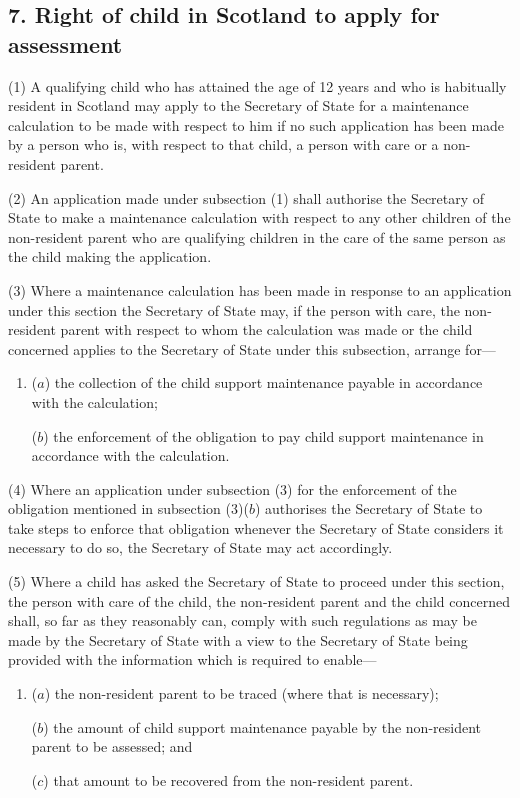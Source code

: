 \documentclass[12pt,a4paper]{article}
\begin{document}
\subsection{7. Right of child in Scotland to apply for assessment}

(1) A qualifying child who has attained the age of 12 years and who is habitually
resident in Scotland may apply to the Secretary of State for a maintenance calculation to be made with respect to him if
no such application has been made by a person who is, with respect to that
child, a person with care or a non-resident parent.

(2)
An application made under subsection (1) shall authorise the 
Secretary of
State to make a maintenance calculation
with respect to
any other children of the non-resident parent
who are qualifying
children in the care of the same person as the child making the application.

(3)
Where a maintenance calculation
has been made in
response to an application under this section the Secretary of State may, if the
person with care, the non-resident parent
with respect to whom the
calculation
was made or the child concerned applies to 
the Secretary
of State under this subsection, arrange for---
\begin{enumerate}\item[]
($a$)
the collection of the child support maintenance payable in accordance
with the calculation;

($b$)
the enforcement of the obligation to pay child support maintenance in
accordance with the calculation.
\end{enumerate}
	
(4)
Where an application under subsection (3) for the enforcement of the
obligation mentioned in subsection (3)($b$) authorises the Secretary of State to take
steps to enforce that obligation whenever the Secretary of State considers it
necessary to do so, the Secretary of State may act accordingly.

(5)
Where a child has asked the Secretary of State to proceed under this section,
the person with care of the child, the non-resident parent
and the
child concerned shall, so far as they reasonably can, comply with such regulations as
may be made by the Secretary of State with a view to the Secretary of State being provided with the information which is required to enable---
\begin{enumerate}\item[]
($a$)
the non-resident parent
to be traced (where that is necessary);

($b$)
the amount of child support maintenance payable by the non-resident parent
to be assessed; and

($c$)
that amount to be recovered from the non-resident parent.
\end{enumerate}
\end{document}
